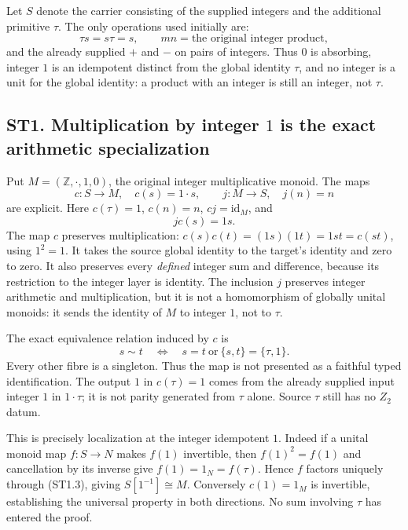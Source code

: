 Let \(S\) denote the carrier consisting of the supplied integers and the
additional primitive \(\tau\). The only operations used initially are:
\[
 \tau s=s\tau=s,\qquad mn=\text{the original integer product},
\tag{ST0.1}
\] and the already supplied \(+\) and \(-\) on pairs of integers. Thus
\(0\) is absorbing, integer \(1\) is an idempotent distinct from the
global identity \(\tau\), and no integer is a unit for the global
identity: a product with an integer is still an integer, not \(\tau\).

\subsection{\texorpdfstring{ST1. Multiplication by integer \(1\) is the
exact arithmetic
specialization}{ST1. Multiplication by integer 1 is the exact arithmetic specialization}}\label{st1.-multiplication-by-integer-1-is-the-exact-arithmetic-specialization}

Put \(M=(\mathbb Z,\cdot,1,0)\), the original integer multiplicative
monoid. The maps \[
 c:S\longrightarrow M,\quad c(s)=1\cdot s,
 \qquad
 j:M\longrightarrow S,\quad j(n)=n
\tag{ST1.1}
\] are explicit. Here \(c(\tau)=1\), \(c(n)=n\), \(cj=\mathrm{id}_M\),
and \[
 jc(s)=1s.
\tag{ST1.2}
\] The map \(c\) preserves multiplication:
\(c(s)c(t)=(1s)(1t)=1st=c(st)\), using \(1^2=1\). It takes the source
global identity to the target's identity and zero to zero. It also
preserves every \emph{defined} integer sum and difference, because its
restriction to the integer layer is identity. The inclusion \(j\)
preserves integer arithmetic and multiplication, but it is not a
homomorphism of globally unital monoids: it sends the identity of \(M\)
to integer \(1\), not to \(\tau\).

The exact equivalence relation induced by \(c\) is \[
 s\sim t\quad\Longleftrightarrow\quad
 s=t\ \text{or}\ \{s,t\}=\{\tau,1\}.
\tag{ST1.3}
\] Every other fibre is a singleton. Thus the map is not presented as a
faithful typed identification. The output \(1\) in \(c(\tau)=1\) comes
from the already supplied input integer \(1\) in \(1\cdot\tau\); it is
not parity generated from \(\tau\) alone. Source \(\tau\) still has no
\(Z_2\) datum.

This is precisely localization at the integer idempotent \(1\). Indeed
if a unital monoid map \(f:S\to N\) makes \(f(1)\) invertible, then
\(f(1)^2=f(1)\) and cancellation by its inverse give
\(f(1)=1_N=f(\tau)\). Hence \(f\) factors uniquely through (ST1.3),
giving \(S[1^{-1}]\cong M\). Conversely \(c(1)=1_M\) is invertible,
establishing the universal property in both directions. No sum involving
\(\tau\) has entered the proof.

